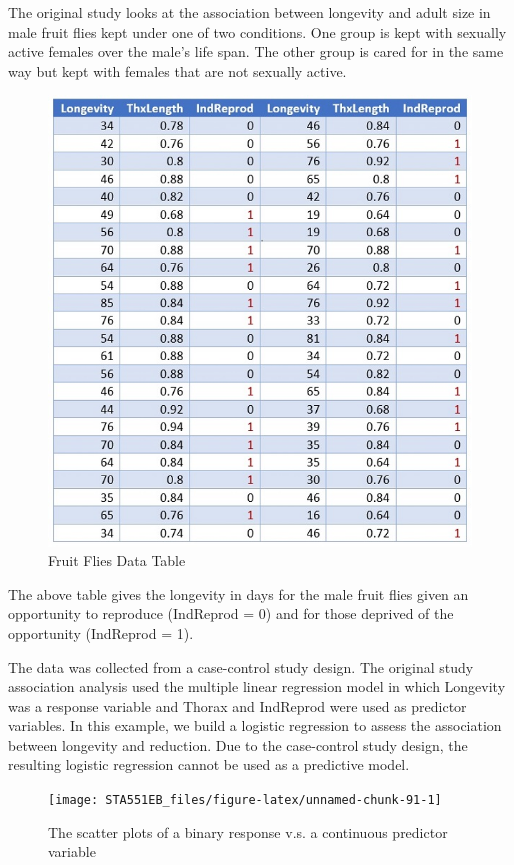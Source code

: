 \documentclass[
]{book}
\begin{document}
The original study looks at the association between longevity and adult size in male fruit flies kept under one of two conditions. One group is kept with sexually active females over the male's life span. The other group is cared for in the same way but kept with females that are not sexually active.

\begin{figure}

{\centering \includegraphics[width=0.8\linewidth]{img04/w04-FruitFlies} 

}

\caption{Fruit Flies Data Table}\label{fig:unnamed-chunk-89}
\end{figure}

The above table gives the longevity in days for the male fruit flies given an opportunity to reproduce (IndReprod = 0) and for those deprived of the opportunity (IndReprod = 1).

The data was collected from a case-control study design. The original study association analysis used the multiple linear regression model in which Longevity was a response variable and Thorax and IndReprod were used as predictor variables. In this example, we build a logistic regression to assess the association between longevity and reduction. Due to the case-control study design, the resulting logistic regression cannot be used as a predictive model.

\begin{figure}

{\centering \texttt{[image: STA551EB\_files/figure-latex/unnamed-chunk-91-1]} 

}

\caption{The scatter plots of a binary response v.s. a continuous predictor variable}\label{fig:unnamed-chunk-91}
\end{figure}
\end{document}
